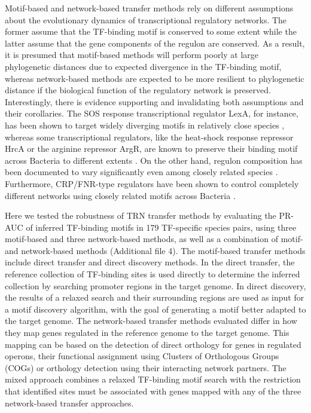 Motif-based and network-based transfer methods rely on different assumptions
about the evolutionary dynamics of transcriptional regulatory networks. The
former assume that the TF-binding motif is conserved to some extent while the
latter assume that the gene components of the regulon are conserved. As a
result, it is presumed that motif-based methods will perform poorly at large
phylogenetic distances due to expected divergence in the TF-binding motif,
whereas network-based methods are expected to be more resilient to phylogenetic
distance if the biological function of the regulatory network is
preserved. Interestingly, there is evidence supporting and invalidating both
assumptions and their corollaries. The SOS response transcriptional regulator
LexA, for instance, has been shown to target widely diverging motifs in
relatively close species \cite{erill2007aeons}, whereas some transcriptional
regulators, like the heat-shock response repressor HrcA or the arginine
repressor ArgR, are known to preserve their binding motif across Bacteria to
different extents \cite{makarova2001conservation, gelfand1999recognition}. On
the other hand, regulon composition has been documented to vary significantly
even among closely related species \cite{erill2004differences,
  venancio2009reconstructing, baumbach2010power,
  price2007orthologous}. Furthermore, CRP/FNR-type regulators have been shown
to control completely different networks using closely related motifs across
Bacteria \cite{dufour2010reconstruction, matsui2013comprehensive}.

Here we tested the robustness of TRN transfer methods by evaluating the PR-AUC
of inferred TF-binding motifs in 179 TF-specific species pairs, using three
motif-based and three network-based methods, as well as a combination of motif-
and network-based methods (Additional file 4). The motif-based transfer methods
include direct transfer and direct discovery methods. In the direct transfer,
the reference collection of TF-binding sites is used directly to determine the
inferred collection by searching promoter regions in the target genome. In
direct discovery, the results of a relaxed search and their surrounding regions
are used as input for a motif discovery algorithm, with the goal of generating
a motif better adapted to the target genome. The network-based transfer methods
evaluated differ in how they map genes regulated in the reference genome to the
target genome. This mapping can be based on the detection of direct orthology
for genes in regulated operons, their functional assignment using Clusters of
Orthologous Groups (COGs) or orthology detection using their interacting
network partners. The mixed approach combines a relaxed TF-binding motif search
with the restriction that identified sites must be associated with genes mapped
with any of the three network-based transfer approaches.

